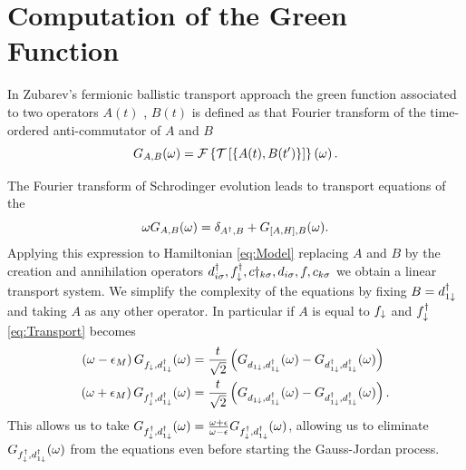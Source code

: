 \documentclass[showpacs,aps,prb,reprint,superscriptaddress]{revtex4-1}
\newcommand{\LUIS}[1]{\textcolor{blue}{\fbox{Luis} {\sl#1}}}
\begin{document}






 \appendix

 
 \section{Computation of the Green Function  \label{sec:Appendix_alg}}
 
 

 

 In Zubarev's fermionic ballistic transport approach \cite{zubarev_double-time_1960} the green function associated to two operators $A(t)$ , $B(t)$ is defined as that Fourier transform of the time-ordered anti-commutator of $A$ and $B$
\begin{equation}
  G_{A,B}(\omega)= \mathcal{F}\left\{ \mathcal{T}\left[\left\{ A(t),B(t')\right\} \right]\right\} \left(\omega\right).
  \label{eq:greenFunction}
\end{equation}

The Fourier transform of Schrodinger evolution leads to transport equations of the 
\begin{equation}
    \omega G_{A,B}(\omega)=\delta_{A^{\dagger},B}+G_{\left[A,H\right],B}(\omega).
    \label{eq:Transport}
\end{equation}
\noindent Applying this expression to Hamiltonian \eqref{eq:Model} replacing $A$ and $B$ by the creation and annihilation operators $d^\dagger_{i\sigma}, f^\dagger_\downarrow,c\dagger_{k\sigma}, d_{i\sigma},f ,c_{k\sigma}$ we obtain a linear transport system. We simplify the complexity of the equations by fixing $B = d^\dagger_{1\downarrow}$ and taking $A$ as any other operator. In particular if $A$ is equal to   $f_\downarrow$ and $f^\dagger_\downarrow$ \ref{eq:Transport} becomes
\begin{align}
        \left(\omega-\epsilon_{M}\right)G_{f_{\downarrow},d_{1\downarrow}^{\dagger}}(\omega)&=\frac{t}{\sqrt{2}}\left(G_{d_{1\downarrow},d_{1\downarrow}^{\dagger}}(\omega)-G_{d_{1\downarrow}^{\dagger},d_{1\downarrow}^{\dagger}}(\omega)\right) \\
    \left(\omega+\epsilon_{M}\right)G_{f_{\downarrow}^{\dagger},d_{1\downarrow}^{\dagger}}(\omega)&=\frac{t}{\sqrt{2}}\left(G_{d_{1\downarrow},d_{1\downarrow}^{\dagger}}(\omega)-G_{d_{1\downarrow}^{\dagger},d_{1\downarrow}^{\dagger}}(\omega)\right).
\end{align}
\noindent This allows us to take $G_{f_{\downarrow}^{\dagger},d_{1\downarrow}^{\dagger}}(\omega) = \frac{\omega + \epsilon}{\omega -\epsilon}G_{f_{\downarrow}^{\dagger},d_{1\downarrow}^{\dagger}}(\omega) $, allowing us to  eliminate $G_{f_{\downarrow}^{\dagger},d_{1\downarrow}^{\dagger}}(\omega) $ from the equations even before starting the Gauss-Jordan process.
\end{document}
